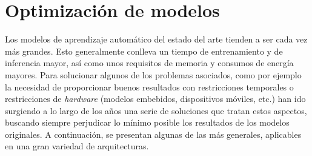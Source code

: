 \section{Optimización de modelos}\label{optimizacion-modelos}


Los modelos de aprendizaje automático del estado del arte tienden a ser cada vez más grandes. Esto generalmente conlleva un tiempo de entrenamiento y de inferencia mayor, así como unos requisitos de memoria y consumos de energía mayores. Para solucionar algunos de los problemas asociados, como por ejemplo la necesidad de proporcionar buenos resultados con restricciones temporales o restricciones de \textit{hardware} (modelos embebidos, dispositivos móviles, etc.) han ido surgiendo a lo largo de los años una serie de soluciones que tratan estos aspectos, buscando siempre perjudicar lo mínimo posible los resultados de los modelos originales. A continuación, se presentan algunas de las más generales, aplicables en una gran variedad de arquitecturas.

